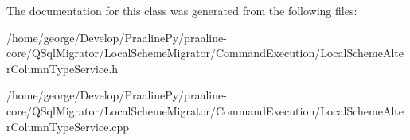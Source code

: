 The documentation for this class was generated from the following files\+:\begin{DoxyCompactItemize}
\item 
/home/george/\+Develop/\+Praaline\+Py/praaline-\/core/\+Q\+Sql\+Migrator/\+Local\+Scheme\+Migrator/\+Command\+Execution/Local\+Scheme\+Alter\+Column\+Type\+Service.\+h\item 
/home/george/\+Develop/\+Praaline\+Py/praaline-\/core/\+Q\+Sql\+Migrator/\+Local\+Scheme\+Migrator/\+Command\+Execution/Local\+Scheme\+Alter\+Column\+Type\+Service.\+cpp\end{DoxyCompactItemize}
